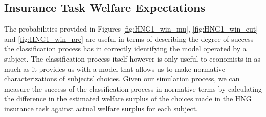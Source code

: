 \documentclass[../main.tex]{subfiles}
\begin{document}
%
%

\subsection{\texorpdfstring{\textcite{Harrison2016}}{Harrison and Ng (2016)} Insurance Task Welfare Expectations}
\label{sec4:WT}

The probabilities provided in Figures \ref{fig:HNG1_win_mu}, \ref{fig:HNG1_win_eut} and \ref{fig:HNG1_win_pre} are useful in terms of describing the degree of success the classification process has in correctly identifying the model operated by a subject.
The classification process itself however is only useful to economists in as much as it provides us with a model that allows us to make normative characterizations of subjects' choices.
Given our simulation process, we can measure the success of the classification process in normative terms by calculating the difference in the estimated welfare surplus of the choices made in the HNG insurance task against actual welfare surplus for each subject.
\end{document}
